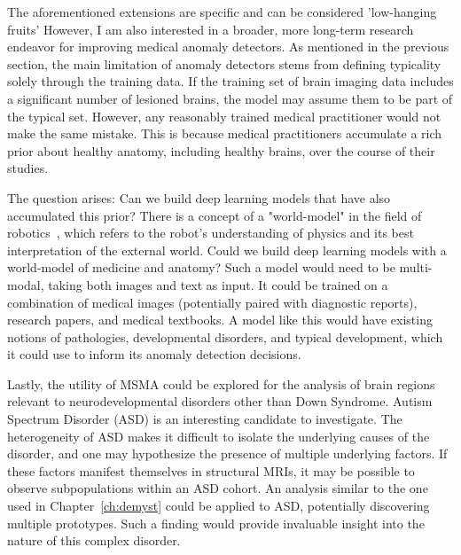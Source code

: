 The aforementioned extensions are specific and can be considered 'low-hanging fruits' However, I am also interested in a broader, more long-term research endeavor for improving medical anomaly detectors. As mentioned in the previous section, the main limitation of anomaly detectors stems from defining typicality solely through the training data. If the training set of brain imaging data includes a significant number of lesioned brains, the model may assume them to be part of the typical set. However, any reasonably trained medical practitioner would not make the same mistake. This is because medical practitioners accumulate a rich prior about healthy anatomy, including healthy brains, over the course of their studies.

The question arises: Can we build deep learning models that have also accumulated this prior? There is a concept of a "world-model" in the field of robotics~\cite{ha2018world}, which refers to the robot's understanding of physics and its best interpretation of the external world. Could we build deep learning models with a world-model of medicine and anatomy? Such a model would need to be multi-modal, taking both images and text as input. It could be trained on a combination of medical images (potentially paired with diagnostic reports), research papers, and medical textbooks. A model like this would have existing notions of pathologies, developmental disorders, and typical development, which it could use to inform its anomaly detection decisions.

Lastly, the utility of MSMA could be explored for the analysis of brain regions relevant to neurodevelopmental disorders other than Down Syndrome. Autism Spectrum Disorder (ASD) is an interesting candidate to investigate. The heterogeneity of ASD makes it difficult to isolate the underlying causes of the disorder, and one may hypothesize the presence of multiple underlying factors. If these factors manifest themselves in structural MRIs, it may be possible to observe subpopulations within an ASD cohort. An analysis similar to the one used in Chapter~\ref{ch:demyst} could be applied to ASD, potentially discovering multiple prototypes. Such a finding would provide invaluable insight into the nature of this complex disorder.